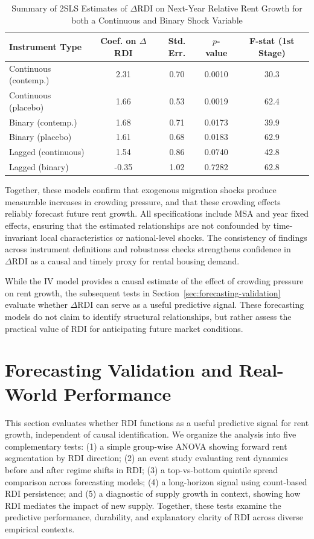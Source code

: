\documentclass[APA,Times1COL]{WileyNJDv5} %
\begin{document}
\begin{table}[h]
	\centering
	\caption{Summary of 2SLS Estimates of $\Delta \text{RDI}$ on Next-Year Relative Rent Growth for both a Continuous and Binary Shock Variable}
	\label{tab:iv-summary}
	\begin{tabular}{lcccc}
		\toprule
		Instrument Type & Coef. on $\Delta$RDI & Std. Err. & $p$-value & F-stat (1st Stage) \\
		\midrule
		Continuous (contemp.) & 2.31 & 0.70 & 0.0010 & 30.3 \\
		Continuous (placebo)  & 1.66 & 0.53 & 0.0019 & 62.4 \\
		Binary (contemp.)     & 1.68 & 0.71 & 0.0173 & 39.9 \\
		Binary (placebo)      & 1.61 & 0.68 & 0.0183 & 62.9 \\
		Lagged (continuous)   & 1.54 & 0.86 & 0.0740 & 42.8 \\
		Lagged (binary)       & -0.35 & 1.02 & 0.7282 & 62.8 \\
		\bottomrule
	\end{tabular}
\end{table}

Together, these models confirm that exogenous migration shocks produce measurable increases in crowding pressure, and that these crowding effects reliably forecast future rent growth. All specifications include MSA and year fixed effects, ensuring that the estimated relationships are not confounded by time-invariant local characteristics or national-level shocks. The consistency of findings across instrument definitions and robustness checks strengthens confidence in \(\Delta \text{RDI}\) as a causal and timely proxy for rental housing demand.

While the IV model provides a causal estimate of the effect of crowding pressure on rent growth, the subsequent tests in Section~\ref{sec:forecasting-validation} evaluate whether \(\Delta \text{RDI}\) can serve as a useful predictive signal. These forecasting models do not claim to identify structural relationships, but rather assess the practical value of RDI for anticipating future market conditions.




\section{Forecasting Validation and Real-World Performance}
This section evaluates whether RDI functions as a useful predictive signal for rent growth, independent of causal identification. We organize the analysis into five complementary tests: (1) a simple group-wise ANOVA showing forward rent segmentation by RDI direction; (2) an event study evaluating rent dynamics before and after regime shifts in RDI; (3) a top-vs-bottom quintile spread comparison across forecasting models; (4) a long-horizon signal using count-based RDI persistence; and (5) a diagnostic of supply growth in context, showing how RDI mediates the impact of new supply. Together, these tests examine the predictive performance, durability, and explanatory clarity of RDI across diverse empirical contexts.
\end{document}
